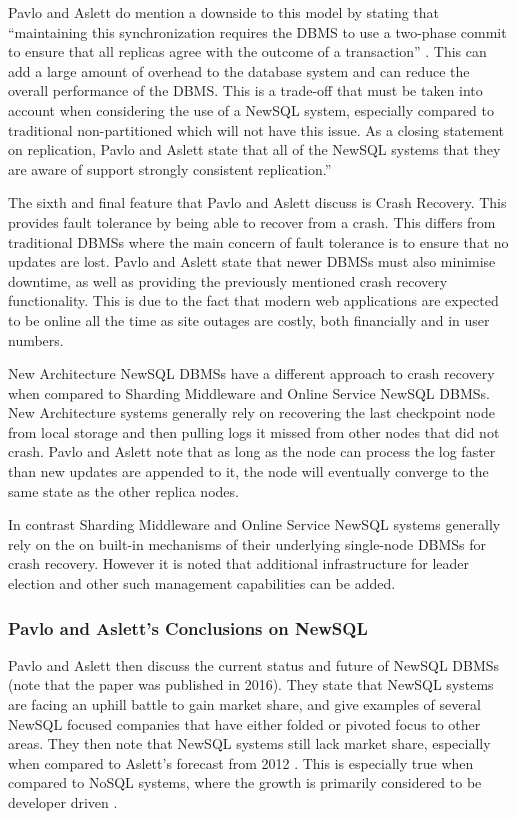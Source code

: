\documentclass[10pt, conference]{IEEEtran}
\begin{document}
Pavlo and Aslett do mention a downside to this model by stating that ``maintaining this synchronization requires the DBMS to use a two-phase commit to ensure that all replicas agree with the outcome of a transaction''  \cite{pavlo}. This can add a large amount of overhead to the database system and can reduce the overall performance of the DBMS. This is a trade-off that must be taken into account when considering the use of a NewSQL system, especially compared to traditional non-partitioned which will not have this issue. As a closing statement on replication, Pavlo and Aslett state that all of the NewSQL systems that they are aware of support strongly consistent replication.''  \cite{pavlo}

The sixth and final feature that Pavlo and Aslett discuss is Crash Recovery. This provides fault tolerance by being able to recover from a crash. This differs from traditional DBMSs where the main concern of fault tolerance is to ensure that no updates are lost. Pavlo and Aslett state that newer DBMSs must also minimise downtime, as well as providing the previously mentioned crash recovery functionality. This is due to the fact that modern web applications are expected to be online all the time as site outages are costly, both financially and in user numbers. 

New Architecture NewSQL DBMSs have a different approach to crash recovery when compared to Sharding Middleware and Online Service NewSQL DBMSs. New Architecture systems generally rely on recovering the last checkpoint node from local storage and then pulling logs it missed from other nodes that did not crash. Pavlo and Aslett note that as long as the node can process the log faster than new updates are appended to it, the node will eventually converge to the same state as the other replica nodes. 

In contrast Sharding Middleware and Online Service NewSQL systems generally rely on the on built-in mechanisms of their underlying single-node DBMSs for crash recovery. However it is noted that additional infrastructure for leader election and other such management capabilities can be added.
 
\subsubsection{Pavlo and Aslett's Conclusions on NewSQL}
Pavlo and Aslett then discuss the current status and future of NewSQL DBMSs (note that the paper was published in 2016). They state that NewSQL systems are facing an uphill battle to gain market share, and give examples of several NewSQL focused companies that have either folded or pivoted focus to other areas. They then note that NewSQL systems still lack market share, especially when compared to Aslett's forecast from 2012 \cite{forecast}. This is especially true when compared to NoSQL systems, where the growth is primarily considered to be developer driven \cite{forecast}.
\end{document}
